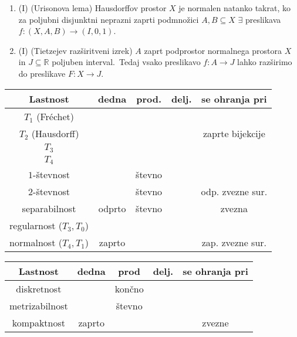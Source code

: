 \documentclass[10pt,a4paper]{article}
\newcommand{\cmark}{\checkmark}%
\newcommand{\xmark}{\ding{55}}%
\begin{document}
\begin{enumerate}
\item (I) (Urisonova lema) Hausdorffov prostor $X$ je normalen natanko takrat, ko za poljubni disjunktni neprazni zaprti podmnožici $A,B\subseteq X$ $\exists$ preslikava $f:(X,A,B)\to(I,0,1)$.
            
\item (I) (Tietzejev razširitveni izrek)  $A$ zaprt podprostor normalnega prostora $X$ in $J\subseteq\mathbb{R}$ poljuben interval.~Tedaj vsako preslikavo $f:A\to J$ lahko razširimo do preslikave $F:X\to J$.
        \end{enumerate}


\begin{table}
    \begin{tabular}{|c|c|c|c|c|}\hline
        Lastnost                & dedna & prod. & delj. & se ohranja pri    \\ \hline
        $T_1$ (Fréchet)         & \cmark& \cmark& \xmark&                   \\ \hline
        $T_2$ (Hausdorff)       & \cmark& \cmark& \xmark& zaprte bijekcije  \\ \hline
        $T_3$                   & \cmark& \cmark& \xmark&                   \\ \hline
        $T_4$                   &       &   	& \xmark&                   \\ \hline
        $1$-števnost            & \cmark& števno& \xmark&                   \\ \hline
        $2$-števnost            & \cmark& števno& \xmark& odp. zvezne sur.  \\ \hline
        separabilnost           & odprto& števno& \cmark& zvezna            \\ \hline
        regularnost ($T_3, T_0$)& \cmark& \cmark&       &                   \\ \hline
        normalnost ($T_4, T_1$) & zaprto&       &       & zap. zvezne sur.  \\ \hline
    \end{tabular}
    \begin{tabular}{|c|c|c|c|c|} \hline
        Lastnost          & dedna & prod  & delj. & se ohranja pri\\ \hline
        diskretnost       & \cmark& končno& \cmark&               \\ \hline
        metrizabilnost    & \cmark& števno& \xmark&               \\ \hline
        kompaktnost       & zaprto& \cmark& \cmark& zvezne        \\ \hline

\end{tabular}
\end{table}
\end{document}
